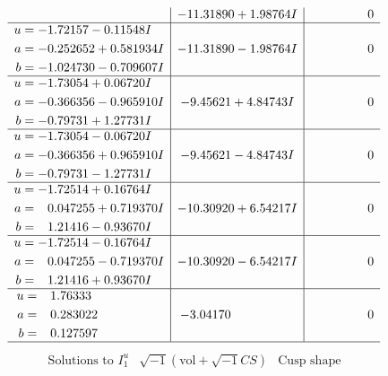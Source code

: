 \documentclass[1p]{elsarticle_modified}
\theoremstyle{definition}
\newcommand{\I}{\sqrt{-1}}
\begin{document}
$$\begin{array}{c|c|c}
 & -11.31890 + 1.98764 I & \phantom{-0.000000 } 0 \\ \hline\begin{aligned}
u &= -1.72157 - 0.11548 I \\
a &= -0.252652 + 0.581934 I \\
b &= -1.024730 - 0.709607 I\end{aligned}
 & -11.31890 - 1.98764 I & \phantom{-0.000000 } 0 \\ \hline\begin{aligned}
u &= -1.73054 + 0.06720 I \\
a &= -0.366356 - 0.965910 I \\
b &= -0.79731 + 1.27731 I\end{aligned}
 & -9.45621 + 4.84743 I & \phantom{-0.000000 } 0 \\ \hline\begin{aligned}
u &= -1.73054 - 0.06720 I \\
a &= -0.366356 + 0.965910 I \\
b &= -0.79731 - 1.27731 I\end{aligned}
 & -9.45621 - 4.84743 I & \phantom{-0.000000 } 0 \\ \hline\begin{aligned}
u &= -1.72514 + 0.16764 I \\
a &= \phantom{-}0.047255 + 0.719370 I \\
b &= \phantom{-}1.21416 - 0.93670 I\end{aligned}
 & -10.30920 + 6.54217 I & \phantom{-0.000000 } 0 \\ \hline\begin{aligned}
u &= -1.72514 - 0.16764 I \\
a &= \phantom{-}0.047255 - 0.719370 I \\
b &= \phantom{-}1.21416 + 0.93670 I\end{aligned}
 & -10.30920 - 6.54217 I & \phantom{-0.000000 } 0 \\ \hline\begin{aligned}
u &= \phantom{-}1.76333\phantom{ +0.000000I} \\
a &= \phantom{-}0.283022\phantom{ +0.000000I} \\
b &= \phantom{-}0.127597\phantom{ +0.000000I}\end{aligned}
 & -3.04170\phantom{ +0.000000I} & \phantom{-0.000000 } 0\\
 \hline 
 \end{array}$$\newpage$$\begin{array}{c|c|c}  
\text{Solutions to }I^u_{1}& \I (\text{vol} + \sqrt{-1}CS) & \text{Cusp shape}\\

\end{array}$$
\end{document}
